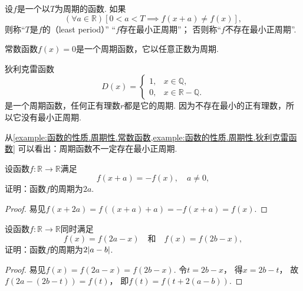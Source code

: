 \begin{definition}
设\(f\)是一个以\(T\)为周期的函数.
如果\begin{equation*}
	(\forall a\in\mathbb{R})
	[0<a<T \implies f(x+a) \neq f(x)],
\end{equation*}
则称“\(T\)是\(f\)的（least period）”
“\(f\)存在最小正周期”；
否则称“\(f\)不存在最小正周期”.
\end{definition}

\begin{example}\label{example:函数的性质.周期性.常数函数}
常数函数\(f(x) = 0\)是一个周期函数，它以任意正数为周期.
\end{example}

\begin{example}\label{example:函数的性质.周期性.狄利克雷函数}
狄利克雷函数\begin{equation*}
	D(x) = \left\{ \begin{array}{ll}
		1, & x \in \mathbb{Q}, \\
		0, & x \in \mathbb{R}-\mathbb{Q}.
	\end{array} \right.
\end{equation*}是一个周期函数，任何正有理数\(r\)都是它的周期.
因为不存在最小的正有理数，所以它没有最小正周期.
\end{example}

\begin{remark}
从\cref{example:函数的性质.周期性.常数函数,example:函数的性质.周期性.狄利克雷函数}
可以看出：周期函数不一定存在最小正周期.
\end{remark}

\begin{example}
设函数\(f\colon\mathbb{R}\to\mathbb{R}\)满足\begin{equation*}
	f(x+a) = -f(x),
	\quad a\neq0,
\end{equation*}
证明：函数\(f\)的周期为\(2a\).
\begin{proof}
易见\(f(x+2a)
=f((x+a)+a)
=-f(x+a)
=f(x)\).
\end{proof}
\end{example}

\begin{example}
设函数\(f\colon\mathbb{R}\to\mathbb{R}\)同时满足\begin{equation*}
	f(x)=f(2a-x)
	\quad\text{和}\quad
	f(x)=f(2b-x),
\end{equation*}
证明：函数\(f\)的周期为\(2\abs{a-b}\).
\begin{proof}
易见\(f(x)
=f(2a-x)
=f(2b-x)\).
令\(t=2b-x\)，
得\(x=2b-t\)，
故\(f(2a-(2b-t))=f(t)\)，
即\(f(t)=f(t+2(a-b))\).
\end{proof}
\end{example}

